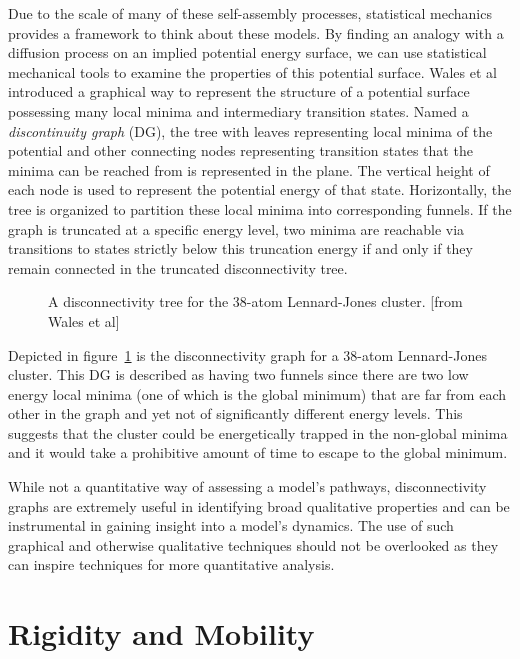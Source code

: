 Due to the scale of many of these self-assembly processes, statistical mechanics provides a framework to think about these models. By finding an analogy with a diffusion process on an implied potential energy surface, we can use statistical mechanical tools to examine the properties of this potential surface. Wales et al introduced a graphical way to represent the structure of a potential surface possessing many local minima and intermediary transition states. Named a \textit{discontinuity graph} (DG), the tree with leaves representing local minima of the potential and other connecting nodes representing transition states that the minima can be reached from is represented in the plane. The vertical height of each node is used to represent the potential energy of that state. Horizontally, the tree is organized to partition these local minima into corresponding funnels. If the graph is truncated at a specific energy level, two minima are reachable via transitions to states strictly below this truncation energy if and only if they remain connected in the truncated disconnectivity tree. 

\begin{figure}[!h]
\caption{A disconnectivity tree for the 38-atom Lennard-Jones cluster. [from Wales et al]}
\label{fig:dg}
\end{figure}

Depicted in figure~\ref{fig:dg} is the disconnectivity graph for a 38-atom Lennard-Jones cluster. This DG is described as having two funnels since there are two low energy local minima (one of which is the global minimum) that are far from each other in the graph and yet not of significantly different energy levels. This suggests that the cluster could be energetically trapped in the non-global minima and it would take a prohibitive amount of time to escape to the global minimum. 

While not a quantitative way of assessing a model's pathways, disconnectivity graphs are extremely useful in identifying broad qualitative properties and can be instrumental in gaining insight into a model's dynamics. The use of such graphical and otherwise qualitative techniques should not be overlooked as they can inspire techniques for more quantitative analysis.  

\section{Rigidity and Mobility}

